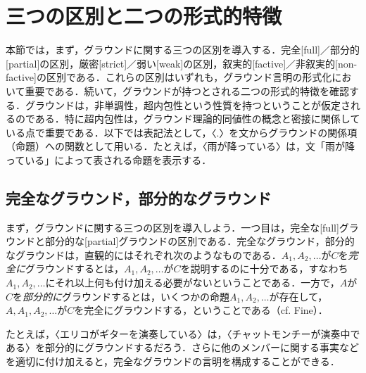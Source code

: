 \documentclass[twoside,14Q,dvipdfmx]{jsarticle}
\theoremstyle{definition}
\begin{document}
\section{三つの区別と二つの形式的特徴}\label{assumption}
本節では，まず，グラウンドに関する三つの区別を導入する．完全[full]／部分的[partial]の区別，厳密[strict]／弱い[weak]の区別，叙実的[factive]／非叙実的[non-factive]の区別である．これらの区別はいずれも，グラウンド言明の形式化において重要である．続いて，グラウンドが持つとされる二つの形式的特徴を確認する．グラウンドは，非単調性，超内包性という性質を持つということが仮定されるのである．特に超内包性は，グラウンド理論的同値性の概念と密接に関係している点で重要である．以下では表記法として，〈.〉を文からグラウンドの関係項（命題）への関数として用いる．たとえば，〈雨が降っている〉は，文「雨が降っている」によって表される命題を表示する．

\subsection{完全なグラウンド，部分的なグラウンド}
まず，グラウンドに関する三つの区別を導入しよう．一つ目は，完全な[full]グラウンドと部分的な[partial]グラウンドの区別である．完全なグラウンド，部分的なグラウンドは，直観的にはそれぞれ次のようなものである．$A_1, A_2, \ldots$が$C$を\emph{完全に}グラウンドするとは，$A_1, A_2, \ldots$が$C$を説明するのに十分である，すなわち$A_1, A_2, \ldots$にそれ以上何も付け加える必要がないということである．一方で，$A$が$C$を\emph{部分的に}グラウンドするとは，いくつかの命題$A_1, A_2, \ldots$が存在して，$A, A_1, A_2, \ldots$が$C$を完全にグラウンドする，ということである（cf. Fine\cite[p.3]{Fine2012b}）．

たとえば，〈エリコがギターを演奏している〉は，〈チャットモンチーが演奏中である〉を部分的にグラウンドするだろう．さらに他のメンバーに関する事実などを適切に付け加えると，完全なグラウンドの言明を構成することができる．
\end{document}
